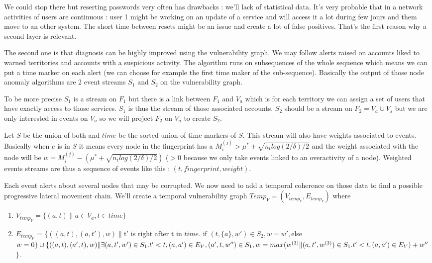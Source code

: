 \documentclass[11pt]{article}
\begin{document}
We could stop there but reserting passwords very often has drawbacks : we'll lack of statistical data. It's very probable that in a network activities of users are continuous : user 1 might be working on an update of a service and will access it a lot during few jours and them move to an other system. The short time between resets might be an issue and create a lot of false positives. That's the first reason why a second layer is relevant.

The second one is that diagnosis can be highly improved using the vulnerability graph. We may follow alerts raised on accounts liked to warned territories and accounts with a suspicious activity. The algorithm runs on subsequences of the whole sequence which means we can put a time marker on each alert (we can choose for example the first time maker of the sub-sequence). Basically the output of those node anomaly algorithms are 2 event streams $S_1$ and $S_2$ on the vulnerability graph. 

To be more precise $S_1$ is a stream on $F_1$ but there is a link between $F_1$ and $V_a$ which is for each territory we can assign a set of users that have exactly access to those services. $S_1$ is thus the stream of those associated accounts. $S_2$ should be a stream on $F_2=V_a\cup V_s$ but we are only interested in events on $V_a$ so we will project $F_2$ on $V_a$ to create $S_2$. 

Let $S$ be the union of both and $time$ be the sorted union of time markers of $S$. This stream will also have weights associated to events. Basically when $e$ is in $S$ it means every node in the fingerprint has a $M_i^{(j)} > \mu^*+\sqrt{n_tlog(2/\delta)/2}$ and the weight associated with the node will be $w = M_i^{(j)} - (\mu^*+\sqrt{n_tlog(2/\delta)/2})$ ($>0$ because we only take events linked to an overactivity of a node). Weighted events streams are thus a sequence of events like this : $(t,fingerprint,weight)$.

Each event alerts about several nodes that may be corrupted. We now need to add a temporal coherence on those data to find a possible progressive lateral movement chain. We'll create a temporal vulnerability graph $Temp_V=(V_{temp_V},E_{temp_V})$ where 
\begin{enumerate}
\item $V_{temp_V} = \{(a,t) \|a \in V_a, t\in time\}$
\item $E_{temp_V}$ = $\{((a,t),(a,t'),w) \| $t' is right after t in $time$. if $(t,\{a\},w')\in S_2, w=w',$else $w=0\}\\
\cup\\
\{((a,t),(a',t),w) \| \exists (a,t',w')\in S_1.t'<t,(a,a')\in E_V,(a',t,w'')\in S_1,w=max(w^{(3)}\|(a,t',w^{(3)})\in S_1.t'<t,(a,a')\in E_V)+w''$$\}$. 
\end{enumerate}
\end{document}
